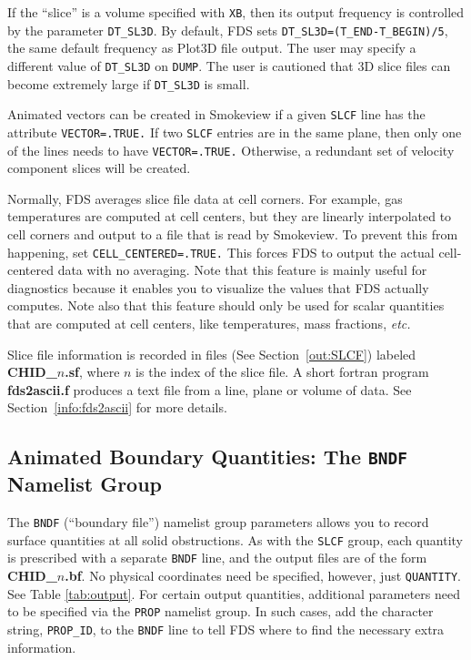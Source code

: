 \documentclass[11pt]{book}
\newcommand{\ct}{\tt\small}
\begin{document}
If the ``slice'' is a volume specified with {\ct XB}, then its output frequency is controlled by the parameter {\ct DT\_SL3D}.  By default, FDS sets {\ct DT\_SL3D=(T\_END-T\_BEGIN)/5}, the same default frequency as Plot3D file output.  The user may specify a different value of {\ct DT\_SL3D} on {\ct DUMP}.  The user is cautioned that 3D slice files can become extremely large if {\ct DT\_SL3D} is small.

Animated vectors can be created in Smokeview if a given {\ct SLCF} line has the attribute {\ct VECTOR=.TRUE.} If two {\ct SLCF}
entries are in the same plane, then only one of the lines needs to have {\ct VECTOR=.TRUE.} Otherwise, a redundant set of velocity
component slices will be created.

Normally, FDS averages slice file data at cell corners. For example, gas temperatures are computed at cell centers, but they
are linearly interpolated to cell corners and output to a file that is read by Smokeview. To prevent this from happening,
set {\ct CELL\_CENTERED=.TRUE.} This forces FDS to output the actual cell-centered data with no averaging. Note that this
feature is mainly useful for diagnostics because it enables you to visualize the values that FDS actually computes. Note also that this
feature should only be used for scalar quantities that are computed at cell centers, like temperatures, mass fractions, {\em etc.}

Slice file information is recorded in files (See Section~\ref{out:SLCF})
labeled {\bf CHID\_$n$.sf}, where $n$ is the index of the slice file.
A short fortran program {\bf fds2ascii.f} produces a text file from a line,
plane or volume of data. See Section~\ref{info:fds2ascii} for more details.






\subsection{Animated Boundary Quantities: The \texorpdfstring{{\tt BNDF}}{BNDF} Namelist Group}
\label{info:BNDF}

The {\ct BNDF} (``boundary file'') namelist group parameters allows you
to record surface quantities at all solid obstructions. As with
the {\ct SLCF} group, each quantity is prescribed with a separate
{\ct BNDF} line, and the output files are of the form {\bf CHID\_$n$.bf}.
No physical coordinates need be specified, however, just {\ct QUANTITY}.
See Table \ref{tab:output}. For certain output quantities, additional parameters need to be specified via
the {\ct PROP} namelist group. In such cases, add the character string, {\ct PROP\_ID}, to the {\ct BNDF} line
to tell FDS where to find the necessary extra information.
\end{document}
